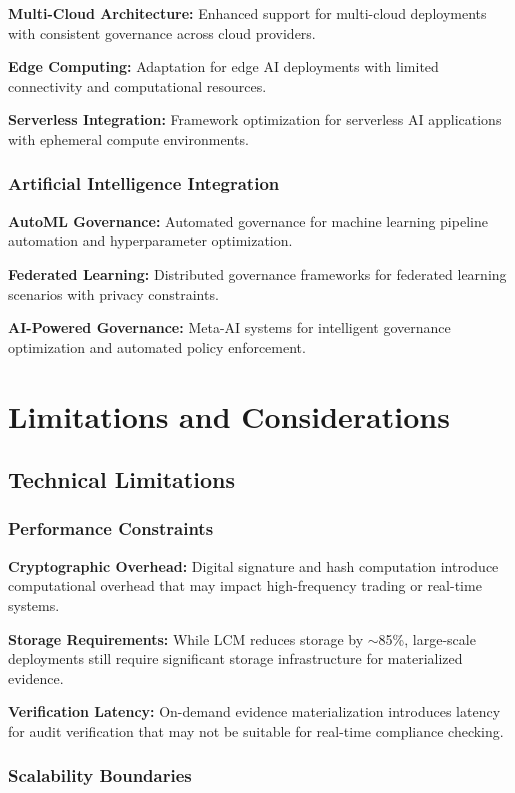 \documentclass[12pt,a4paper]{article}
\begin{document}
\textbf{Multi-Cloud Architecture:} Enhanced support for multi-cloud deployments with consistent governance across cloud providers.

\textbf{Edge Computing:} Adaptation for edge AI deployments with limited connectivity and computational resources.

\textbf{Serverless Integration:} Framework optimization for serverless AI applications with ephemeral compute environments.

\subsubsection{Artificial Intelligence Integration}

\textbf{AutoML Governance:} Automated governance for machine learning pipeline automation and hyperparameter optimization.

\textbf{Federated Learning:} Distributed governance frameworks for federated learning scenarios with privacy constraints.

\textbf{AI-Powered Governance:} Meta-AI systems for intelligent governance optimization and automated policy enforcement.

\section{Limitations and Considerations}

\subsection{Technical Limitations}

\subsubsection{Performance Constraints}

\textbf{Cryptographic Overhead:} Digital signature and hash computation introduce computational overhead that may impact high-frequency trading or real-time systems.

\textbf{Storage Requirements:} While LCM reduces storage by $\sim$85\%, large-scale deployments still require significant storage infrastructure for materialized evidence.

\textbf{Verification Latency:} On-demand evidence materialization introduces latency for audit verification that may not be suitable for real-time compliance checking.

\subsubsection{Scalability Boundaries}
\end{document}
